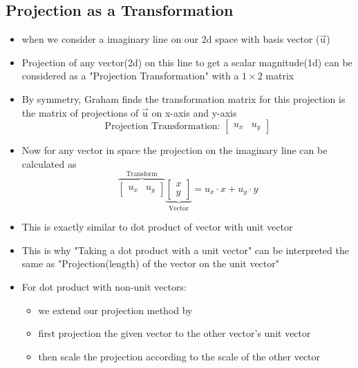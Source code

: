 \documentclass[a4paper]{article}
\begin{document}
\subsection{Projection as a Transformation}
\begin{itemize}
	\item when we consider a imaginary line on our 2d space with
	      basis vector ($\vec{\text{u}}$)
	\item Projection of any vector(2d) on this line to get
	      a scalar magnitude(1d) can be considered as a
	      "Projection Transformation" with a
	      $1 \times 2$ matrix
	\item By symmetry, Graham finds the transformation
	      matrix for this projection is the matrix of projections
	      of $\vec{\text{u}}$ on x-axis and y-axis
	      \[
		      \text{Projection Transformation: }
		      \begin{bmatrix}
			      u_{x} & u_{y}  \end{bmatrix}
	      \]
	\item Now for any vector in space the projection
	      on the imaginary line can be calculated as
	      \[
		      \overbrace{
			      \begin{bmatrix}
				      u_{x} & u_{y}  \end{bmatrix}
		      }^{\text{Transform}}
		      \underbrace{
			      \begin{bmatrix}
				      x \\
				      y\end{bmatrix}
		      }_{\text{Vector}}
		      = u_{x} \cdot x
		      + u_{y} \cdot y
	      \]
	\item This is exactly similar to dot product of vector
	      with unit vector
	\item This is why "Taking a dot product with a unit vector"
	      can be interpreted the same as
	      "Projection(length) of the vector on the unit vector"
	\item For dot product with non-unit vectors:
	      \begin{itemize}
		      \item we extend our projection method by
		      \item first projection the given vector to the
		            other vector's unit vector
		      \item then scale the projection according to the
		            scale of the other vector
	      \end{itemize}
\end{itemize}
\end{document}
